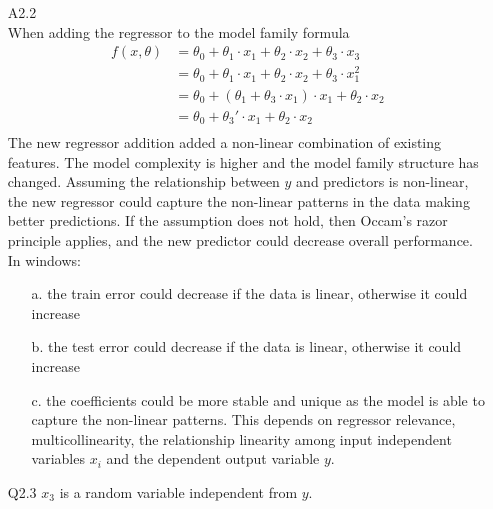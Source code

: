 \documentclass[unicode, 11pt, a4paper]{scrartcl}
\newcommand{\myex}[1]{\begin{equation*}\begin{aligned} #1 \end{aligned}\end{equation*}}
\begin{document}
\begin{itemize}
	\item[A2.2] ~\\
	      When adding the regressor to the model family formula
	      \myex{
		      f(x, \theta) &= \theta_0 + \theta_1 \cdot x_1 + \theta_2 \cdot x_2 + \theta_3 \cdot x_3\\
		      &= \theta_0 + \theta_1 \cdot x_1 + \theta_2 \cdot x_2 + \theta_3 \cdot x_1^2\\
		      &= \theta_0 + (\theta_1 + \theta_3 \cdot x_1) \cdot x_1 + \theta_2 \cdot x_2\\
		      &= \theta_0 + \theta_3' \cdot x_1 + \theta_2 \cdot x_2\\
	      }
	      The new regressor addition added a non-linear combination of existing features.
	      The model complexity is higher and the model family structure has changed.
	      Assuming the relationship between $y$ and predictors is non-linear,
	      the new regressor could capture the non-linear patterns in the data making better predictions.
	      If the assumption does not hold, then Occam's razor principle applies,
	      and the new predictor could decrease overall performance.
	      In windows:
	      \begin{itemize}
		      \item[a.] the train error could decrease if the data is linear, otherwise it could increase
		      \item[b.] the test error could decrease if the data is linear, otherwise it could increase
		      \item[c.] the coefficients could be more stable and unique
		            as the model is able to capture the non-linear patterns.
		            This depends on regressor relevance, multicollinearity, the relationship linearity among
		            input independent variables $x_i$ and the dependent output variable $y$.
	      \end{itemize}

	\item[Q2.3] $x_3$ is a random variable independent from $y$.


\end{itemize}
\end{document}
